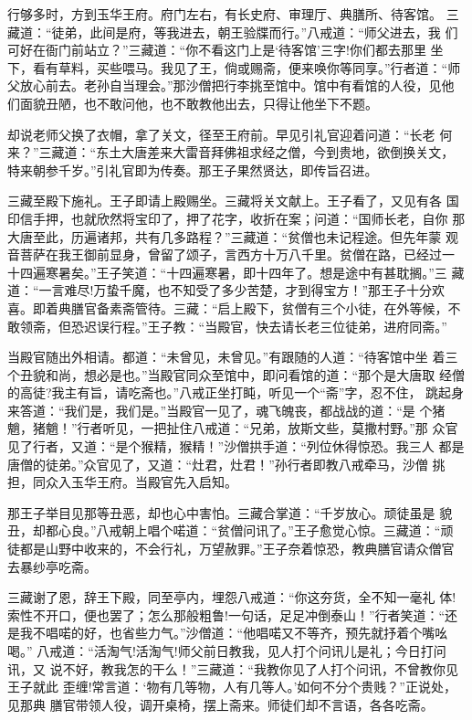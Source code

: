 行够多时，方到玉华王府。府门左右，有长史府、审理厅、典膳所、待客馆。
三藏道：“徒弟，此间是府，等我进去，朝王验牒而行。”八戒道：“师父进去，我
们可好在衙门前站立？”三藏道：“你不看这门上是‘待客馆’三字!你们都去那里
坐下，看有草料，买些喂马。我见了王，倘或赐斋，便来唤你等同享。”行者道：“师
父放心前去。老孙自当理会。”那沙僧把行李挑至馆中。馆中有看馆的人役，见他
们面貌丑陋，也不敢问他，也不敢教他出去，只得让他坐下不题。

却说老师父换了衣帽，拿了关文，径至王府前。早见引礼官迎着问道：“长老
何来？”三藏道：“东土大唐差来大雷音拜佛祖求经之僧，今到贵地，欲倒换关文，
特来朝参千岁。”引礼官即为传奏。那王子果然贤达，即传旨召进。

三藏至殿下施礼。王子即请上殿赐坐。三藏将关文献上。王子看了，又见有各
国印信手押，也就欣然将宝印了，押了花字，收折在案；问道：“国师长老，自你
那大唐至此，历遍诸邦，共有几多路程？”三藏道：“贫僧也未记程途。但先年蒙
观音菩萨在我王御前显身，曾留了颂子，言西方十万八千里。贫僧在路，已经过一
十四遍寒暑矣。”王子笑道：“十四遍寒暑，即十四年了。想是途中有甚耽搁。”三
藏道：“一言难尽!万蛰千魔，也不知受了多少苦楚，才到得宝方！”那王子十分欢
喜。即着典膳官备素斋管待。三藏：“启上殿下，贫僧有三个小徒，在外等候，不
敢领斋，但恐迟误行程。”王子教：“当殿官，快去请长老三位徒弟，进府同斋。”

当殿官随出外相请。都道：“未曾见，未曾见。”有跟随的人道：“待客馆中坐
着三个丑貌和尚，想必是也。”当殿官同众至馆中，即问看馆的道：“那个是大唐取
经僧的高徒?我主有旨，请吃斋也。”八戒正坐打盹，听见一个“斋”字，忍不住，
跳起身来答道：“我们是，我们是。”当殿官一见了，魂飞魄丧，都战战的道：“是
个猪魈，猪魈！”行者听见，一把扯住八戒道：“兄弟，放斯文些，莫撒村野。”那
众官见了行者，又道：“是个猴精，猴精！”沙僧拱手道：“列位休得惊恐。我三人
都是唐僧的徒弟。”众官见了，又道：“灶君，灶君！”孙行者即教八戒牵马，沙僧
挑担，同众入玉华王府。当殿官先入启知。

那王子举目见那等丑恶，却也心中害怕。三藏合掌道：“千岁放心。顽徒虽是
貌丑，却都心良。”八戒朝上唱个喏道：“贫僧问讯了。”王子愈觉心惊。三藏道：“顽
徒都是山野中收来的，不会行礼，万望赦罪。”王子奈着惊恐，教典膳官请众僧官
去暴纱亭吃斋。

三藏谢了恩，辞王下殿，同至亭内，埋怨八戒道：“你这夯货，全不知一毫礼
体!索性不开口，便也罢了；怎么那般粗鲁!一句话，足足冲倒泰山！”行者笑道：“还
是我不唱喏的好，也省些力气。”沙僧道：“他唱喏又不等齐，预先就抒着个嘴吆喝。”
八戒道：“活淘气!活淘气!师父前日教我，见人打个问讯儿是礼；今日打问讯，又
说不好，教我怎的干么！”三藏道：“我教你见了人打个问讯，不曾教你见王子就此
歪缠!常言道：‘物有几等物，人有几等人。’如何不分个贵贱？”正说处，见那典
膳官带领人役，调开桌椅，摆上斋来。师徒们却不言语，各各吃斋。

